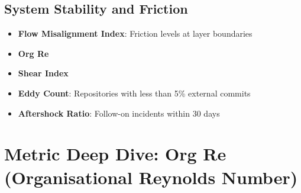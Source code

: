 \documentclass[11pt]{article}
\begin{document}
\subsection*{System Stability and Friction}
\begin{itemize}
  \item \textbf{Flow Misalignment Index}: Friction levels at layer boundaries
  \item \textbf{Org Re}
  \item \textbf{Shear Index}
  \item \textbf{Eddy Count}: Repositories with less than 5\% external commits
  \item \textbf{Aftershock Ratio}: Follow-on incidents within 30 days
\end{itemize}

\section{Metric Deep Dive: Org Re (Organisational Reynolds Number)}
\end{document}

